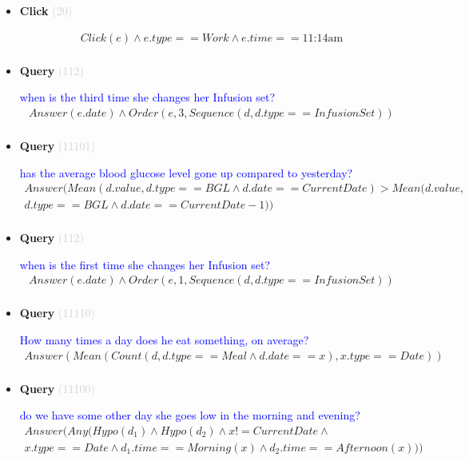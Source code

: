 \documentclass[11pt]{article}
\newcommand{\key}[1]{\textcolor{lightgray}{#1}}
\newcounter{CQuery}
\newcounter{CClick}
\begin{document}
\begin{itemize}
\item
\textbf{Click\theCClick} \key{(20)} \addtocounter{CClick}{1}
\textcolor{blue}{  }
\begin{multline*}
Click(e) \wedge e.type==Work \wedge e.time==\mbox{11:14am} \\ 
\end{multline*}


\item
\textbf{Query\theCQuery} \key{(112)} \addtocounter{CQuery}{1}
\textcolor{blue}{ when is the third time she changes her Infusion set? }
\begin{multline*}
Answer(e.date) \wedge Order(e, 3, Sequence(d, d.type==InfusionSet)) \\ 
\end{multline*}


\item
\textbf{Query\theCQuery} \key{(11101)} \addtocounter{CQuery}{1}
\textcolor{blue}{ has the average blood glucose level gone up compared to yesterday? }
\begin{multline*}
Answer(Mean(d.value, d.type==BGL \wedge d.date==CurrentDate) > Mean(d.value, \\ 
d.type==BGL \wedge d.date==CurrentDate-1)) \\ 
\end{multline*}


\item
\textbf{Query\theCQuery} \key{(112)} \addtocounter{CQuery}{1}
\textcolor{blue}{ when is the first time she changes her Infusion set? }
\begin{multline*}
Answer(e.date) \wedge Order(e, 1, Sequence(d, d.type==InfusionSet)) \\ 
\end{multline*}


\item
\textbf{Query\theCQuery} \key{(11110)} \addtocounter{CQuery}{1}
\textcolor{blue}{ How many times a day does he eat something, on average? }
\begin{multline*}
Answer(Mean(Count(d, d.type==Meal \wedge d.date==x), x.type==Date)) \\ 
\end{multline*}


\item
\textbf{Query\theCQuery} \key{(11100)} \addtocounter{CQuery}{1}
\textcolor{blue}{ do we have some other day she goes low in the morning and evening? }
\begin{multline*}
Answer(Any(Hypo(d_1) \wedge Hypo(d_2) \wedge x != CurrentDate \wedge \\ 
x.type==Date \wedge d_1.time==Morning(x) \wedge d_2.time==Afternoon(x))) \\ 
\end{multline*}



\end{itemize}
\end{document}
